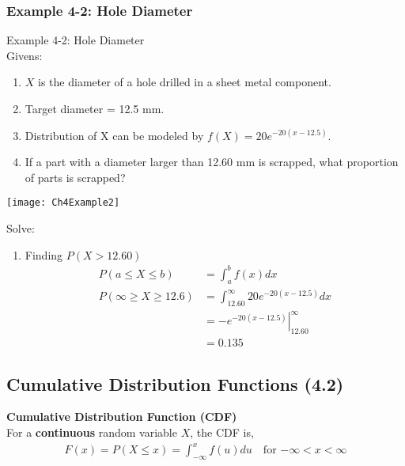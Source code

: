 \documentclass[../INDE315.tex]{subfiles}
\begin{document}
\subsubsection*{Example 4-2: Hole Diameter}
\begin{exmp} Example 4-2: Hole Diameter \\
    Givens:
    \begin{enumerate}
        \item $X$ is the diameter of a hole drilled in a sheet metal component.
        \item Target diameter = 12.5 mm.
        \item Distribution of X can be modeled by $f(X) = 20 e^{-20(x-12.5)}$.
        \item If a part with a diameter larger than 12.60 mm is scrapped, what proportion of parts is scrapped?
    \end{enumerate}
    \begin{center}
        \texttt{[image: Ch4Example2]}
    \end{center}
\end{exmp}
Solve:
\begin{enumerate}
    \item Finding $P(X > 12.60)$
        \begin{equation*}
            \begin{aligned}
                P(a \leq X \leq b) &= \int _a ^b f(x) dx \\
                P(\infty \geq X \geq 12.6) &= \int _{12.60} ^{\infty} 20 e^{-20(x-12.5)} dx \\
                            &= \left. -e^{-20(x-12.5)} \right|_{12.60} ^{\infty} \\
                            &= 0.135
            \end{aligned}
        \end{equation*}
\end{enumerate}

\subsection*{Cumulative Distribution Functions (4.2)}
\begin{defn}
    \textbf{Cumulative Distribution Function (CDF)} \\
    For a \textbf{continuous} random variable $X$, the CDF is,
    \begin{equation*}
        \begin{aligned}
            F(x) = P(X \leq x) = \int ^x _{-\infty} f(u) du \quad \text{for $-\infty < x < \infty$}
        \end{aligned}
    \end{equation*}
\end{defn}
\end{document}
